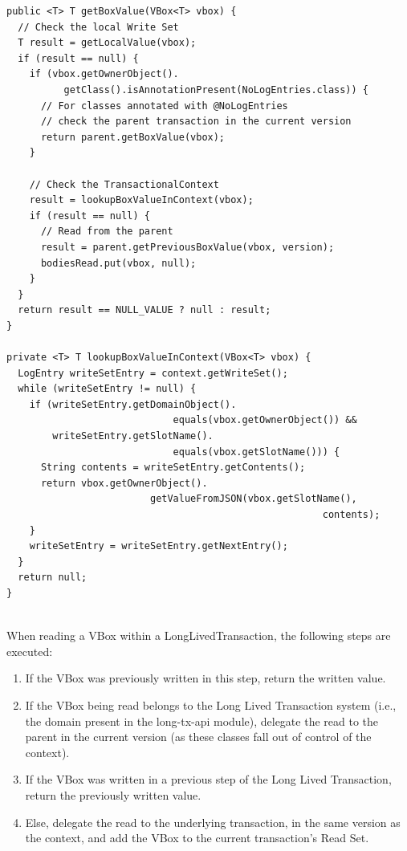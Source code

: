 \begin{lstlisting}[caption={Reading a VBox within a Context}]
public <T> T getBoxValue(VBox<T> vbox) {
  // Check the local Write Set
  T result = getLocalValue(vbox);
  if (result == null) {
    if (vbox.getOwnerObject().
          getClass().isAnnotationPresent(NoLogEntries.class)) {
      // For classes annotated with @NoLogEntries
      // check the parent transaction in the current version
      return parent.getBoxValue(vbox);
    }

    // Check the TransactionalContext
    result = lookupBoxValueInContext(vbox);
    if (result == null) {
      // Read from the parent
      result = parent.getPreviousBoxValue(vbox, version);
      bodiesRead.put(vbox, null);
    }
  }
  return result == NULL_VALUE ? null : result;
}

private <T> T lookupBoxValueInContext(VBox<T> vbox) {
  LogEntry writeSetEntry = context.getWriteSet();
  while (writeSetEntry != null) {
    if (writeSetEntry.getDomainObject().
                             equals(vbox.getOwnerObject()) &&
        writeSetEntry.getSlotName().
                             equals(vbox.getSlotName())) {
      String contents = writeSetEntry.getContents();
      return vbox.getOwnerObject().
                         getValueFromJSON(vbox.getSlotName(),
                                                       contents);
    }
    writeSetEntry = writeSetEntry.getNextEntry();
  }
  return null;
}


\end{lstlisting}

When reading a VBox within a LongLivedTransaction, the following
steps are executed:

\begin{enumerate}

\item If the VBox was previously written in this step, return the
  written value.

\item If the VBox being read belongs to the Long Lived Transaction
  system (i.e., the domain present in the long-tx-api module),
  delegate the read to the parent in the current version (as these
  classes fall out of control of the context).

\item If the VBox was written in a previous step of the Long Lived
  Transaction, return the previously written value.

\item Else, delegate the read to the underlying transaction, in the
  same version as the context, and add the VBox to the current
  transaction's Read Set.

\end{enumerate}


